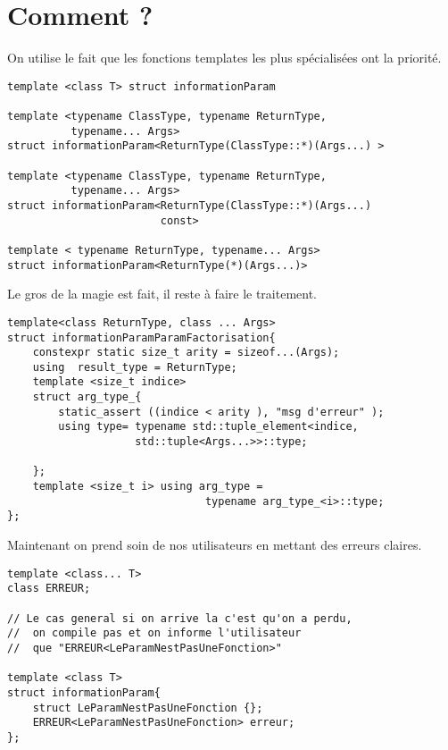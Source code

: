 \documentclass{beamer}
\begin{document}
\section{Comment ?}


\begin{frame}[containsverbatim]
On utilise le fait que les fonctions templates les plus spécialisées ont la priorité.
\begin{verbatim}
template <class T> struct informationParam 

template <typename ClassType, typename ReturnType,
          typename... Args>
struct informationParam<ReturnType(ClassType::*)(Args...) >

template <typename ClassType, typename ReturnType,
          typename... Args>
struct informationParam<ReturnType(ClassType::*)(Args...)
                        const>

template < typename ReturnType, typename... Args>
struct informationParam<ReturnType(*)(Args...)>
\end{verbatim}

\end{frame} 


\begin{frame}[containsverbatim]
Le gros de la magie est fait, il reste à faire le traitement.
\begin{verbatim}
template<class ReturnType, class ... Args>
struct informationParamParamFactorisation{
    constexpr static size_t arity = sizeof...(Args);
    using  result_type = ReturnType;
    template <size_t indice>
    struct arg_type_{
        static_assert ((indice < arity ), "msg d'erreur" );
        using type= typename std::tuple_element<indice,
                    std::tuple<Args...>>::type;

    };
    template <size_t i> using arg_type = 
                               typename arg_type_<i>::type;
};
\end{verbatim}
\end{frame} 

\begin{frame}[containsverbatim]
Maintenant on prend soin de nos utilisateurs en mettant des erreurs claires. 
\begin{verbatim}
template <class... T>
class ERREUR;

// Le cas general si on arrive la c'est qu'on a perdu,
//  on compile pas et on informe l'utilisateur
//  que "ERREUR<LeParamNestPasUneFonction>"

template <class T>
struct informationParam{
    struct LeParamNestPasUneFonction {};
    ERREUR<LeParamNestPasUneFonction> erreur;
};
\end{verbatim}
\end{frame}
\end{document}
